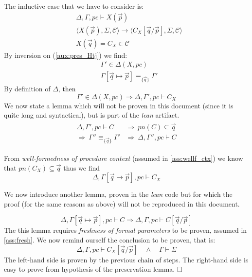 \documentclass[12pt,a4paper,twoside]{book}
\newcommand{\qed}{\hfill\square}
\begin{document}
The inductive case that we have to consider is:
\begin{align}
	&\Delta,\Gamma,pc \vdash X(\vec{p})\label{aux:pres_Htj}\tag{H1}\\
	&\langle X(\vec{p}), \Sigma, \mathscr{C}\rangle \rightarrow
	\langle C_X[\vec{q}/\vec{p}], \Sigma, \mathscr{C}\rangle\label{aux:pres_Hlto}\tag{H2}\\
	&X(\vec{q}) = C_X \in \mathscr{C}\label{aux:pres_Hlook}\tag{H3}
\end{align}
By inversion on (\ref{aux:pres_Htj}) we find:
\begin{align}
	&\Gamma' \in \Delta(X,pc) \label{aux:pres_Htj1}\tag{H11}\\
	&\Gamma[\vec{q}\mapsto \vec{p}] \equiv_{\{\vec{q}\}} \Gamma'\label{aux:pres_Htj2}\tag{H12}
\end{align}
By definition of $\Delta$, then
$$
\Gamma' \in \Delta(X,pc) \Rightarrow \Delta, \Gamma', pc \vdash C_X
$$
We now state a lemma which will not be proven in this document (since it is quite long and syntactical), but is part of the \emph{lean} artifact.
\begin{align*}\label{aux:pres_lemma2}
\begin{split}
	\Delta, \Gamma', pc \vdash C 
	&\Rightarrow~ pn(C) \subseteq \vec{q}\\
	\Rightarrow~ \Gamma'' \equiv_{\{\vec{q}\}} \Gamma'
	&\Rightarrow~ \Delta, \Gamma'', pc \vdash C
\end{split}
\end{align*}

From \emph{well-formedness of procedure context} (assumed in \ref{ass:wellf_ctx})
we know that $pn(C_X) \subseteq \vec{q}$ thus we find
$$
\Delta,\Gamma[\vec{q}\mapsto\vec{p}],pc \vdash C_X
$$

We now introduce another lemma, proven in the \emph{lean} code but for which the proof (for the same reasons as above) will not be reproduced in this document.

\begin{equation*}\label{aux:pres_lemma1}
\Delta, \Gamma[\vec{q}\mapsto\vec{p}], pc \vdash C \Rightarrow
\Delta, \Gamma, pc \vdash C[\vec{q}/\vec{p}]
\end{equation*}
The this lemma requires \emph{freshness of formal parameters} to be proven, assumed in \ref{ass:fresh}.
We now remind ourself the conclusion to be proven, that is:
$$
\Delta, \Gamma, pc \vdash C_X[\vec{q}/\vec{p}]\quad\land\quad \Gamma \vdash \Sigma
$$
The left-hand side is proven by the previous chain of steps.
The right-hand side is easy to prove from hypothesis of the preservation lemma.
$\qed$
\end{document}
